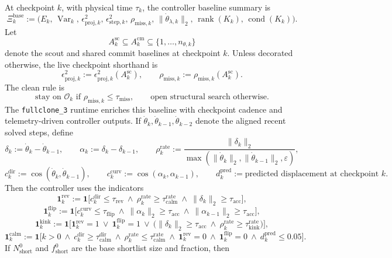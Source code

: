 \documentclass[11pt]{article}
\begin{document}
At checkpoint \(k\), with physical time \(\tau_k\), the controller baseline summary is
\[
\Xi_k^{\mathrm{base}}
:=
\bigl(
E_k,\,
\operatorname{Var}_k,\,
\epsilon_{\mathrm{proj},k}^2,\,
\epsilon_{\mathrm{step},k}^2,\,
\rho_{\mathrm{miss},k},\,
\|\dot\theta_{\lambda,k}\|_2,\,
\operatorname{rank}(K_k),\,
\operatorname{cond}(K_k)
\bigr).
\]
Let
\[
A_k^{\mathrm{sc}}\subseteq A_k^{\mathrm{cm}}\subseteq\{1,\dots,n_{\theta,k}\}
\]
denote the scout and shared commit baselines at checkpoint \(k\). Unless decorated otherwise, the live checkpoint shorthand is
\[
\epsilon_{\mathrm{proj},k}^2:=\epsilon_{\mathrm{proj},k}^2(A_k^{\mathrm{sc}}),
\qquad
\rho_{\mathrm{miss},k}:=\rho_{\mathrm{miss},k}(A_k^{\mathrm{sc}}).
\]
The clean rule is
\[
\text{stay on }\mathcal O_k\text{ if }\rho_{\mathrm{miss},k}\le \tau_{\mathrm{miss}},
\qquad
\text{open structural search otherwise.}
\]
The \texttt{fullclone\_3} runtime enriches this baseline with checkpoint cadence and telemetry-driven controller outputs. If \(\dot\theta_k,\dot\theta_{k-1},\dot\theta_{k-2}\) denote the aligned recent solved steps, define
\[
\delta_k:=\dot\theta_k-\dot\theta_{k-1},
\qquad
\alpha_k:=\delta_k-\delta_{k-1},
\qquad
\rho_k^{\mathrm{rate}}
:=
\frac{\|\delta_k\|_2}{\max(\|\dot\theta_k\|_2,\|\dot\theta_{k-1}\|_2,\varepsilon)},
\]
\[
c_k^{\mathrm{dir}}
:=
\cos(\dot\theta_k,\dot\theta_{k-1}),
\qquad
c_k^{\mathrm{curv}}
:=
\cos(\alpha_k,\alpha_{k-1}),
\qquad
d_k^{\mathrm{pred}}:=\text{predicted displacement at checkpoint }k.
\]
Then the controller uses the indicators
\[
\mathbf 1_k^{\mathrm{rev}}
:=
\mathbf 1\!\bigl[
c_k^{\mathrm{dir}}\le \tau_{\mathrm{rev}}
\ \wedge\
\rho_k^{\mathrm{rate}}\ge \tau_{\mathrm{calm}}^{\mathrm{rate}}
\ \wedge\
\|\delta_k\|_2\ge \tau_{\mathrm{acc}}
\bigr],
\]
\[
\mathbf 1_k^{\mathrm{flip}}
:=
\mathbf 1\!\bigl[
c_k^{\mathrm{curv}}\le \tau_{\mathrm{flip}}
\ \wedge\
\|\alpha_k\|_2\ge \tau_{\mathrm{acc}}
\ \wedge\
\|\alpha_{k-1}\|_2\ge \tau_{\mathrm{acc}}
\bigr],
\]
\[
\mathbf 1_k^{\mathrm{kink}}
:=
\mathbf 1\!\bigl[
\mathbf 1_k^{\mathrm{rev}}=1
\ \vee\
\mathbf 1_k^{\mathrm{flip}}=1
\ \vee\
\bigl(\|\delta_k\|_2\ge \tau_{\mathrm{acc}}
\ \wedge\
\rho_k^{\mathrm{rate}}\ge \tau_{\mathrm{kink}}^{\mathrm{rate}}\bigr)
\bigr],
\]
\[
\mathbf 1_k^{\mathrm{calm}}
:=
\mathbf 1\!\bigl[
k>0
\ \wedge\
c_k^{\mathrm{dir}}\ge \tau_{\mathrm{calm}}^{\mathrm{dir}}
\ \wedge\
\rho_k^{\mathrm{rate}}\le \tau_{\mathrm{calm}}^{\mathrm{rate}}
\ \wedge\
\mathbf 1_k^{\mathrm{rev}}=0
\ \wedge\
\mathbf 1_k^{\mathrm{flip}}=0
\ \wedge\
d_k^{\mathrm{pred}}\le 0.05
\bigr].
\]
If \(N_{\mathrm{short}}^0\) and \(f_{\mathrm{short}}^0\) are the base shortlist size and fraction, then
\end{document}
